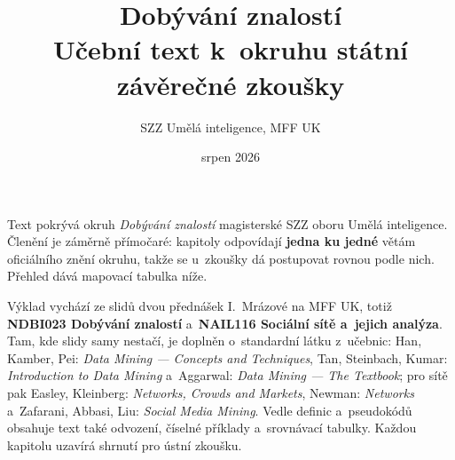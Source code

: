 \documentclass[11pt,a4paper]{article}
\title{\textbf{Dobývání znalostí}\\[2mm]
\large Učební text k~okruhu státní závěrečné zkoušky}
\author{SZZ Umělá inteligence, MFF UK}
\date{srpen 2026}
\theoremstyle{definition}
\begin{document}
\maketitle

\begin{center}
\begin{minipage}{0.92\textwidth}
\small
Text pokrývá okruh \emph{Dobývání znalostí} magisterské SZZ oboru Umělá inteligence.
Členění je záměrně přímočaré: kapitoly odpovídají \textbf{jedna ku jedné} větám oficiálního
znění okruhu, takže se u~zkoušky dá postupovat rovnou podle nich. Přehled dává mapovací
tabulka níže.

Výklad vychází ze slidů dvou přednášek I.~Mrázové na MFF UK, totiž \textbf{NDBI023 Dobývání
znalostí} a~\textbf{NAIL116 Sociální sítě a~jejich analýza}. Tam, kde slidy samy nestačí, je
doplněn o~standardní látku z~učebnic: Han, Kamber, Pei: \emph{Data Mining --- Concepts and
Techniques}, Tan, Steinbach, Kumar: \emph{Introduction to Data Mining} a~Aggarwal:
\emph{Data Mining --- The Textbook}; pro sítě pak Easley, Kleinberg: \emph{Networks, Crowds
and Markets}, Newman: \emph{Networks} a~Zafarani, Abbasi, Liu: \emph{Social Media Mining}.
Vedle definic a~pseudokódů obsahuje text také odvození, číselné příklady a~srovnávací
tabulky. Každou kapitolu uzavírá shrnutí pro ústní zkoušku.
\end{minipage}
\end{center}
\end{document}
